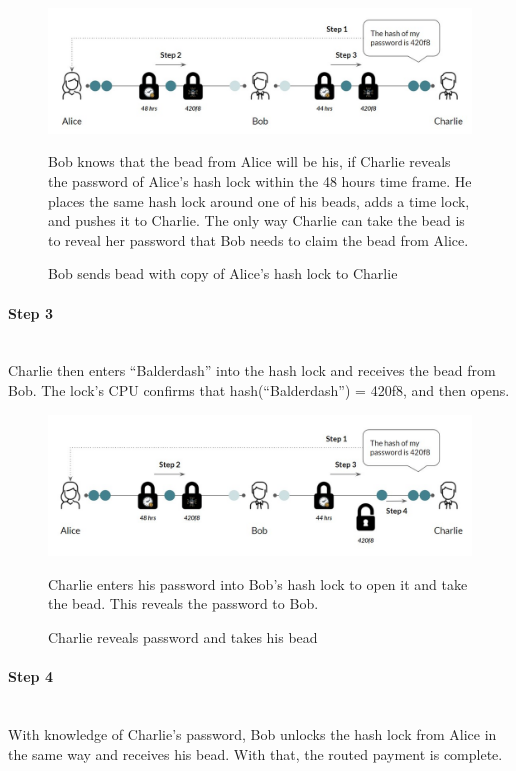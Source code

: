 \documentclass[a4paper, 12pt]{report}
\begin{document}
\begin{figure}[H]
	\includegraphics[width=\textwidth]{10_HTLC_Step2}
	\caption{Bob sends bead with copy of Alice's hash lock to Charlie}
	\medskip
	\small Bob knows that the bead from Alice will be his, if Charlie reveals the password of Alice's hash lock within the 48 hours time frame. He places the same hash lock around one of his beads, adds a time lock, and pushes it to Charlie. The only way Charlie can take the bead is to reveal her password that Bob needs to claim the bead from Alice.
	\label{fig:10_HTLC_Step2}
\end{figure} 

\paragraph{Step 3} \hspace{0pt} \\
Charlie then enters “Balderdash” into the hash lock and receives the bead from Bob. The lock’s CPU confirms that hash(“Balderdash”) = 420f8, and then opens.

\begin{figure}[H]
	\includegraphics[width=\textwidth]{11_HTLC_Step3}
	\caption{Charlie reveals password and takes his bead}
	\medskip
	\small Charlie enters his password into Bob's hash lock to open it and take the bead. This reveals the password to Bob.
	\label{fig:11_HTLC_Step3}
\end{figure} 

\paragraph{Step 4} \hspace{0pt} \\
With knowledge of Charlie’s password, Bob unlocks the hash lock from Alice in the same way and receives his bead. With that, the routed payment is complete.
\end{document}
